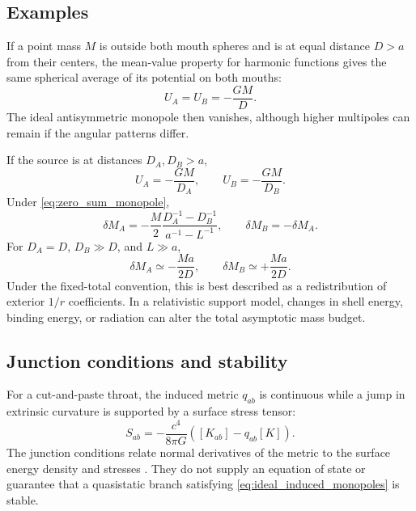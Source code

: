 \documentclass[journal,a4paper]{IEEEtran}
\begin{document}
\subsection{Examples}

If a point mass \(M\) is outside both mouth spheres and is at equal distance \(D>a\) from their centers, the mean-value property for harmonic functions gives the same spherical average of its potential on both mouths:
\begin{equation}
    U_A=U_B=-\frac{GM}{D}.
\end{equation}
The ideal antisymmetric monopole then vanishes, although higher multipoles can remain if the angular patterns differ.

If the source is at distances \(D_A,D_B>a\),
\begin{equation}
    U_A=-\frac{GM}{D_A},
    \qquad
    U_B=-\frac{GM}{D_B}.
\end{equation}
Under \eqref{eq:zero_sum_monopole},
\begin{equation}
    \delta M_A
    =-\frac{M}{2}
    \frac{D_A^{-1}-D_B^{-1}}
    {a^{-1}-L^{-1}},
    \qquad
    \delta M_B=-\delta M_A.
\end{equation}
For \(D_A=D\), \(D_B\gg D\), and \(L\gg a\),
\begin{equation}
    \delta M_A\simeq-\frac{Ma}{2D},
    \qquad
    \delta M_B\simeq+\frac{Ma}{2D}.
\end{equation}
Under the fixed-total convention, this is best described as a redistribution of exterior \(1/r\) coefficients. In a relativistic support model, changes in shell energy, binding energy, or radiation can alter the total asymptotic mass budget.

\subsection{Junction conditions and stability}

For a cut-and-paste throat, the induced metric \(q_{ab}\) is continuous while a jump in extrinsic curvature is supported by a surface stress tensor:
\begin{equation}
    \boxed{
    S_{ab}=-\frac{c^4}{8\pi G}
    \left([K_{ab}]-q_{ab}[K]\right).
    }
    \label{eq:israel}
\end{equation}
The junction conditions relate normal derivatives of the metric to the surface energy density and stresses \cite{Israel1966,PoissonToolkit}. They do not supply an equation of state or guarantee that a quasistatic branch satisfying \eqref{eq:ideal_induced_monopoles} is stable.
\end{document}
